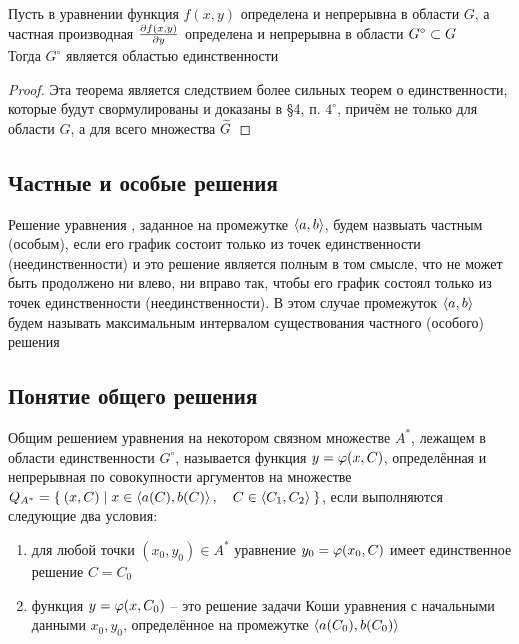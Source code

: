\begin{theorem}\label{th:uniq:weak}
    Пусть в уравнении  функция $ f(x, y) $ определена и непрерывна в области $ G $, а частная производная $ \frac{\partial {f(x, y)}}{\partial {y}} $ определена и непрерывна в области $ G^\circ \subset G $ \\
    Тогда $ G^\circ $ является областью единственности
\end{theorem}

\begin{proof}
    Эта теорема является следствием более сильных теорем о единственности, которые будут свормулированы и доказаны в \S4, п. $ 4^\circ $, причём не только для области $ G $, а для всего множества $ \widetilde{G} $
\end{proof}

\subsection{Частные и особые решения}

\begin{definition}
    Решение уравнения , заданное на промежутке $ \Braket{a, b} $, будем назвыать частным (особым), если его график состоит только из точек единственности (неединственности) и это решение является полным в том смысле, что не может быть продолжено ни влево, ни вправо так, чтобы его график состоял только из точек единственности (неединственности). В этом случае промежуток $ \Braket{a, b} $ будем называть максимальным интервалом существования частного (особого) решения
\end{definition}

\subsection{Понятие общего решения}

\begin{definition}\label{def:common}
    Общим решением уравнения  на некотором связном множестве $ A^* $, лежащем в области единственности $ G^\circ $, называется функция $ y = \varphi(x, C) $, определённая и непрерывная по совокупности аргументов на множестве $ Q_{A^*} = \Set{(x, C) | x \in \Braket{a(C), b(C)}, \quad C \in \Braket{C_1, C_2}} $, если выполняются следующие два условия:
    \begin{enumerate}
    	\item для любой точки $ (x_0, y_0) \in A^* $ уравнение $ y_0 = \varphi(x_0, C) $ имеет единственное решение $ C = C_0 $
        \item функция $ y = \varphi(x, C_0) $ -- это решение задачи Коши уравнения  с начальными данными $ x_0, y_0 $, определённое на промежутке $ \Braket{a(C_0), b(C_0)} $
    \end{enumerate}
\end{definition}

